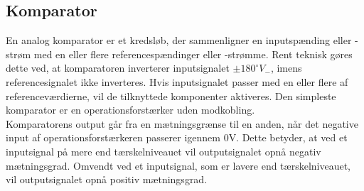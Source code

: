 \subsection{Komparator}\label{Komparatorafsnit}
En analog komparator er et kredsløb, der sammenligner en inputspænding eller -strøm med en eller flere referencespændinger eller -strømme. Rent teknisk gøres dette ved, at komparatoren inverterer inputsignalet $\pm180^{\circ} V_{-}$, imens referencesignalet ikke inverteres. Hvis inputsignalet passer med en eller flere af referenceværdierne, vil de tilknyttede komponenter aktiveres. Den simpleste komparator er en operationsforstærker uden modkobling. \cite{webster2009} \\
Komparatorens output går fra en mætningsgrænse til en anden, når det negative input af operationsforstærkeren passerer igennem $0$V. Dette betyder, at ved et inputsignal på mere end tærskelniveauet vil outputsignalet opnå negativ mætningsgrad. Omvendt ved et inputsignal, som er lavere end tærskelniveauet, vil outputsignalet opnå positiv mætningsgrad. \cite{webster2009} 

